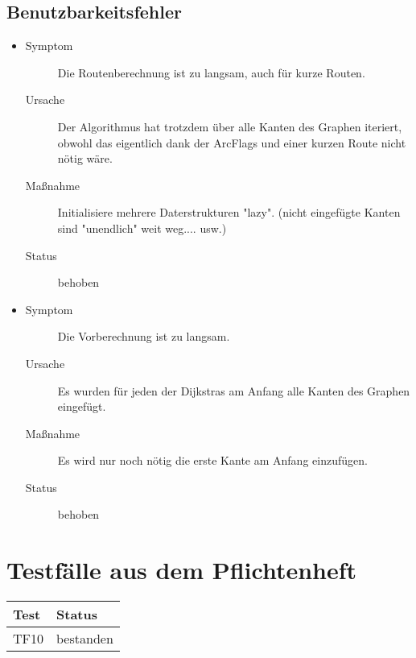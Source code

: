 \documentclass[a4paper, 11pt]{article}
\newcommand{\bug}[4]{%
  \item
    \begin{description}
    \item[Symptom] #1
    \item[Ursache] #2
    \item[Maßnahme] #3
    \item[Status] #4
    \end{description}
}
\begin{document}
\subsection{Benutzbarkeitsfehler}
\begin{itemize}
\bug{
Die Routenberechnung ist zu langsam, auch für kurze Routen.
}{
Der Algorithmus hat trotzdem über alle Kanten des Graphen iteriert, obwohl das eigentlich dank der ArcFlags und einer kurzen Route nicht nötig wäre.
}{
Initialisiere mehrere Daterstrukturen "lazy". (nicht eingefügte Kanten sind "unendlich" weit weg.... usw.)
}{
behoben
}
\bug{
Die Vorberechnung ist zu langsam.
}{
Es wurden für jeden der Dijkstras am Anfang alle Kanten des Graphen eingefügt.
}{
Es wird nur noch nötig die erste Kante am Anfang einzufügen.
}{
behoben
}
\end{itemize}
\section{Testfälle aus dem Pflichtenheft}

\begin{tabular}{|l|l|}
	\hline
	Test & Status \\
	\hline
	\hline
	TF10 & bestanden \\
	\hline
\end{tabular}
\end{document}
